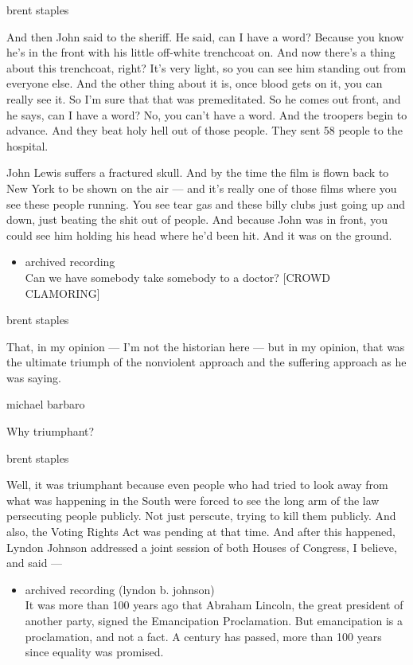 brent staples

And then John said to the sheriff. He said, can I have a word? Because
you know he's in the front with his little off-white trenchcoat on. And
now there's a thing about this trenchcoat, right? It's very light, so
you can see him standing out from everyone else. And the other thing
about it is, once blood gets on it, you can really see it. So I'm sure
that that was premeditated. So he comes out front, and he says, can I
have a word? No, you can't have a word. And the troopers begin to
advance. And they beat holy hell out of those people. They sent 58
people to the hospital.

John Lewis suffers a fractured skull. And by the time the film is flown
back to New York to be shown on the air --- and it's really one of those
films where you see these people running. You see tear gas and these
billy clubs just going up and down, just beating the shit out of people.
And because John was in front, you could see him holding his head where
he'd been hit. And it was on the ground.

\begin{itemize}
\tightlist
\item
  archived recording\\
  Can we have somebody take somebody to a doctor? {[}CROWD CLAMORING{]}
\end{itemize}

brent staples

That, in my opinion --- I'm not the historian here --- but in my
opinion, that was the ultimate triumph of the nonviolent approach and
the suffering approach as he was saying.

michael barbaro

Why triumphant?

brent staples

Well, it was triumphant because even people who had tried to look away
from what was happening in the South were forced to see the long arm of
the law persecuting people publicly. Not just perscute, trying to kill
them publicly. And also, the Voting Rights Act was pending at that time.
And after this happened, Lyndon Johnson addressed a joint session of
both Houses of Congress, I believe, and said ---

\begin{itemize}
\tightlist
\item
  archived recording (lyndon b. johnson)\\
  It was more than 100 years ago that Abraham Lincoln, the great
  president of another party, signed the Emancipation Proclamation. But
  emancipation is a proclamation, and not a fact. A century has passed,
  more than 100 years since equality was promised.
\end{itemize}

